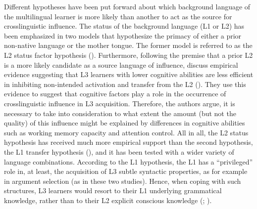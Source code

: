 \documentclass[output=paper,colorlinks,citecolor=brown,nonflat]{../langscibook}
\begin{document}
Different hypotheses have been put forward about which background language of the multilingual learner is more likely than another to act as the source for crosslinguistic influence. The status of the background language (L1 or L2) has been emphasized in two models that hypothesize the primacy of either a prior non-native language or the mother tongue. The former model is referred to as the L2 status factor hypothesis (\citealt{BardelFalk2007, BardelFalk2012, FalkBardel2010, BardelSánchez2017}). Furthermore, following the premise that a prior L2 is a more likely candidate as a source language of influence, \citet{BardelSánchez2017} discuss empirical evidence suggesting that L3 learners with lower cognitive abilities are less efficient in inhibiting non-intended activation and transfer from the L2 (\citealt{SánchezBardel2016, Sánchez2019Complexity}). They use this evidence to suggest that cognitive factors play a role in the occurrence of crosslinguistic influence in L3 acquisition. Therefore, the authors argue, it is necessary to take into consideration to what extent the amount (but not the quality) of this influence might be explained by differences in cognitive abilities such as working memory capacity and attention control. All in all, the L2 status hypothesis has received much more empirical support than the second hypothesis, the L1 transfer hypothesis (\citealt{NaRanongLeung2009, Hermas2010}), and it has been tested with a wider variety of language combinations. According to the L1 hypothesis, the L1 has a “privileged” role in, at least, the acquisition of L3 subtle syntactic properties, as for example in argument selection (as in these two studies). Hence, when coping with such structures, L3 learners would resort to their L1 underlying grammatical knowledge, rather than to their L2 explicit conscious knowledge (\citealt[185]{NaRanongLeung2009}; \citealt[358]{Hermas2010}).
\end{document}
